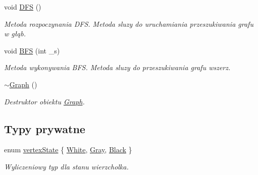 \begin{DoxyCompactItemize}
void \hyperlink{struct_graph_aa89036af82002a332699d5722d7863d9}{D\-F\-S} ()
\begin{DoxyCompactList}\small\item\em Metoda rozpoczynania D\-F\-S. Metoda sluzy do uruchamiania przeszukiwania grafu w głąb. \end{DoxyCompactList}\item 
void \hyperlink{struct_graph_ab25e348f68d6ccb51765dcc547b65ff0}{B\-F\-S} (int \-\_\-s)
\begin{DoxyCompactList}\small\item\em Metoda wykonywania B\-F\-S. Metoda sluzy do przeszukiwania grafu wszerz. \end{DoxyCompactList}\item 
\hyperlink{struct_graph_a902c5b3eacb66d60752525ab23297a95}{$\sim$\-Graph} ()
\begin{DoxyCompactList}\small\item\em Destruktor obiektu \hyperlink{struct_graph}{Graph}. \end{DoxyCompactList}\end{DoxyCompactItemize}
\subsection*{Typy prywatne}
\begin{DoxyCompactItemize}
\item 
enum \hyperlink{struct_graph_a0046a1a92a5949395eab395fed7b778c}{vertex\-State} \{ \hyperlink{struct_graph_a0046a1a92a5949395eab395fed7b778cab88fda19b4d020cc4275fb8632d0679b}{White}, 
\hyperlink{struct_graph_a0046a1a92a5949395eab395fed7b778ca348bae6aacbec71f300c8346028cd151}{Gray}, 
\hyperlink{struct_graph_a0046a1a92a5949395eab395fed7b778ca0915f0cf88c9f5071c2b00f21daeffe1}{Black}
 \}
\begin{DoxyCompactList}\small\item\em Wyliczeniowy typ dla stanu wierzcholka. \end{DoxyCompactList}\end{DoxyCompactItemize}
